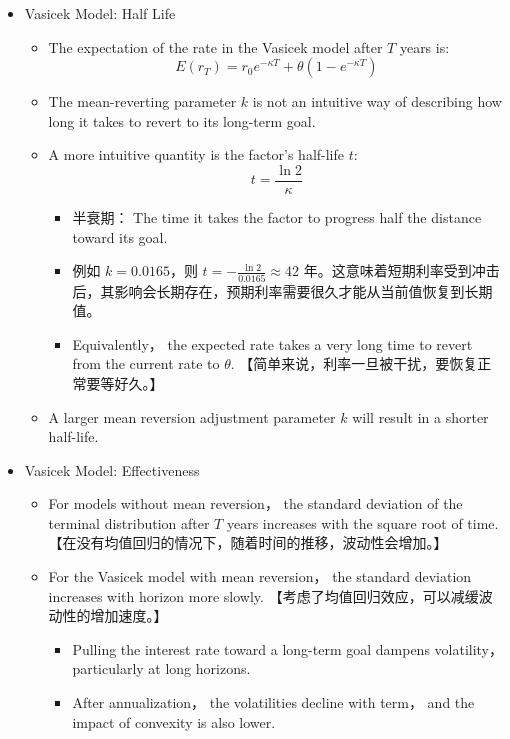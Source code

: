 \begin{itemize}
 \item Vasicek Model: Half Life
    \begin{itemize}
    \item The expectation of the rate in the Vasicek model after \( T \) years is:
        \[
        E(r_T) = r_0 e^{-\kappa T} + \theta \left(1 - e^{-\kappa T}\right)
        \]
    \item The mean-reverting parameter \( k \) is not an intuitive way of describing how long it takes to revert to its long-term goal.
    \item A more intuitive quantity is the factor's half-life \( t \):
        \[
        t = \frac{\ln 2}{\kappa}
        \]
        \begin{itemize}
        \item 半衰期： The time it takes the factor to progress half the distance
         toward its goal.
        \item 例如 \( k = 0.0165 \)，则 \( t = -\frac{\ln 2}{0.0165} \approx 42 \) 年。这意味着短期利率受到冲击后，其影响会长期存在，预期利率需要很久才能从当前值恢复到长期值。
        \item Equivalently， the expected rate takes a very long time to revert from the current rate to \( \theta \). 【简单来说，利率一旦被干扰，要恢复正常要等好久。】
        \end{itemize}
    \item A larger mean reversion adjustment parameter \( k \) will result in a shorter half-life.
    \end{itemize}

    
\item Vasicek Model: Effectiveness
    
    \begin{itemize}
    \item For models without mean reversion， the standard deviation of the terminal distribution after \( T \) years increases with the square root of time. 【在没有均值回归的情况下，随着时间的推移，波动性会增加。】
    \item For the Vasicek model with mean reversion， the standard deviation increases with horizon more slowly. 【考虑了均值回归效应，可以减缓波动性的增加速度。】
        \begin{itemize}
        \item Pulling the interest rate toward a long-term goal dampens volatility， particularly at long horizons.
        \item After annualization， the volatilities decline with term， and the impact of convexity is also lower.
        \end{itemize}
    \end{itemize}

\end{itemize}


